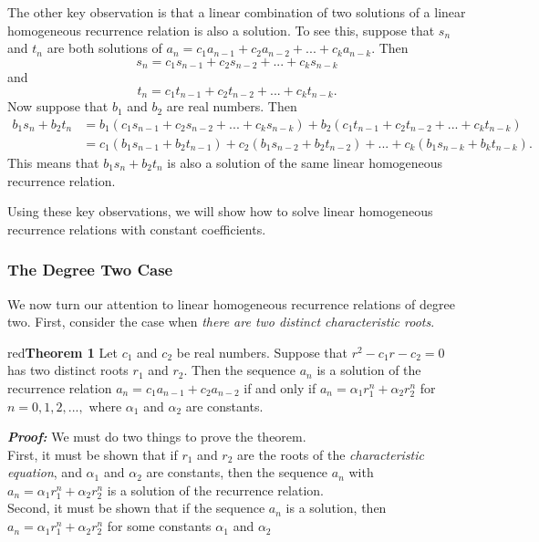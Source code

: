 \documentclass[11pt]{article}
\newenvironment{theorem}[1]{\begin{mybox}{red}{\textbf{Theorem #1}}}{\end{mybox}}
\begin{document}
The other key observation is that a linear combination of two solutions of a linear homogeneous recurrence relation is also a solution. To see this, suppose that $s_n$ and $t_n$ are both solutions of $a_n = c_1a_{n-1} + c_2a_{n-2} + ... + c_ka_{n-k}$. Then
\begin{equation*}
    s_n = c_1s_{n-1} + c_2s_{n-2} + ... + c_ks_{n-k}    
\end{equation*}
and
\begin{equation*}
    t_n = c_1t_{n-1} + c_2t_{n-2} + ... + c_kt_{n-k}.    
\end{equation*}
Now suppose that $b_1$ and $b_2$ are real numbers. Then
\begin{align*}
    b_1s_n + b_2t_n &= b_1(c_1s_{n-1} + c_2s_{n-2} + ... + c_ks_{n-k}) + b_2(c_1t_{n-1} + c_2t_{n-2} + ... + c_kt_{n-k})\\
    &= c_1(b_1s_{n-1} + b_2t_{n-1}) + c_2(b_1s_{n-2} + b_2t_{n-2}) + ... + c_k(b_1s_{n-k} + b_kt_{n-k}).    
\end{align*}
This means that $b_1s_n + b_2t_n$ is also a solution of the same linear homogeneous recurrence relation.

Using these key observations, we will show how to solve linear homogeneous recurrence
relations with constant coefficients.

\subsubsection{The Degree Two Case}

We now turn our attention to linear homogeneous recurrence relations of degree two. First, consider the case when \textit{there are two distinct characteristic roots}.

\begin{theorem}{1}
Let $c_1$ and $c_2$ be real numbers. Suppose that $r^2 - c_1r - c_2 = 0$ has two distinct roots $r_1$ and $r_2$. Then the sequence ${a_n}$ is a solution of the recurrence relation $a_n = c_1a_{n-1} + c_2a_{n-2}$ if and only if $a_n = \alpha_1r^n_1 + \alpha_2r^n_2$ for $n = 0, 1, 2, ...,$ where $\alpha_1$ and $\alpha_2$ are constants.
\end{theorem}

\textbf{\textit{Proof:}} We must do two things to prove the theorem.\\
First, it must be shown that if $r_1$ and $r_2$ are the roots of the \textit{characteristic equation}, and $\alpha_1$ and $\alpha_2$ are constants, then the sequence ${a_n}$ with $a_n = \alpha_1r^n_1 + \alpha_2r^n_2$ is a solution of the recurrence relation.\\
Second, it must be shown that if the sequence ${a_n}$ is a solution, then $a_n = \alpha_1r^n_1 + \alpha_2r^n_2$ for some constants $\alpha_1$ and $\alpha_2$
\end{document}
